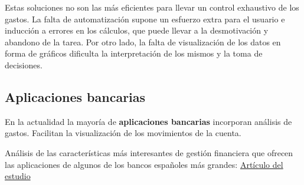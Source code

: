 Estas soluciones no son las más eficientes para llevar un control exhaustivo de los gastos. La falta de automatización supone un esfuerzo extra para el usuario e inducción a errores en los cálculos, que puede llevar a la desmotivación y abandono de la tarea. Por otro lado, la falta de visualización de 
los datos en forma de gráficos dificulta la interpretación de los mismos y la toma de decisiones.

\subsection{Aplicaciones bancarias}
En la actualidad la mayoría de \textbf{aplicaciones bancarias} incorporan análisis de gastos. 
Facilitan la visualización de los movimientos de la cuenta. 

Análisis de las características más interesantes de gestión financiera que ofrecen las aplicaciones de algunos de los bancos españoles más grandes:
\href{https://es.wikipedia.org/wiki/Anexo:Bancos_de_España}{Artículo del estudio}

